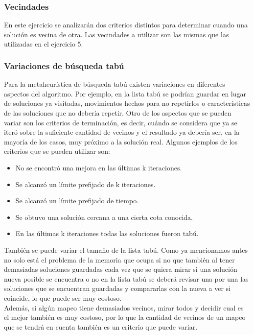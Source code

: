 \subsubsection*{Vecindades}
\noindent En este ejercicio se analizarán dos criterios distintos para determinar cuando una solución es vecina de otra.
Las vecindades a utilizar son las mismas que las utilizadas en el ejercicio 5. 

\subsubsection*{Variaciones de búsqueda tabú}
\noindent Para la metaheurística de búsqueda tabú existen variaciones en diferentes aspectos del algoritmo. Por ejemplo, en la lista tabú se podrían guardar en lugar de soluciones ya visitadas, movimientos hechos para no repetirlos o características de las soluciones que no debería repetir. Otro de los aspectos que se pueden variar son los criterios de terminación, es decir, cuándo se considera que ya se iteró sobre la suficiente cantidad de vecinos y el resultado ya debería ser, en la mayoría de los casos, muy próximo a la solución real. Algunos ejemplos de los criterios que se pueden utilizar son:
\begin{itemize}
    \item No se encontró una mejora en las últimas k iteraciones.
	\item Se alcanzó un límite prefijado de k iteraciones.
	\item Se alcanzó un límite prefijado de tiempo.
    \item Se obtuvo una solución cercana a una cierta cota conocida.
    \item En las últimas k iteraciones todas las soluciones fueron tabú.
\end{itemize}
También se puede variar el tamaño de la lista tabú. Como ya mencionamos antes no solo está el problema de la memoria que ocupa si no que también al tener demasiadas soluciones guardadas cada vez que se quiera mirar si una solución nueva posible se encuentra o no en la lista tabú se deberá revisar una por una las soluciones que se encuentran guardadas y compararlas con la nueva a ver si coincide, lo que puede ser muy costoso. \\
Además, si algún mapeo tiene demasiados vecinos, mirar todos y decidir cual es el mejor también es muy costoso, por lo que la cantidad de vecinos de un mapeo que se tendrá en cuenta también es un criterio que puede variar. \\
